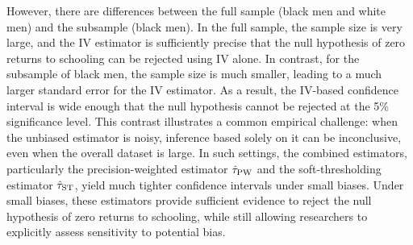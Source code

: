 \documentclass[11pt]{article}
\numberwithin{equation}{section}
\theoremstyle{definition}
\begin{document}
However, there are differences between the full sample (black men and white men) and the subsample (black men). In the full sample, the sample size is very large, and the IV estimator is sufficiently precise that the null hypothesis of zero returns to schooling can be rejected using IV alone. In contrast, for the subsample of black men, the sample size is much smaller, leading to a much larger standard error for the IV estimator. As a result, the IV-based confidence interval is wide enough that the null hypothesis cannot be rejected at the 5\% significance level. This contrast illustrates a common empirical challenge: when the unbiased estimator is noisy, inference based solely on it can be inconclusive, even when the overall dataset is large. In such settings, the combined estimators, particularly the precision-weighted estimator $\hat\tau_{\rm PW}$ and the soft-thresholding estimator $\hat\tau_{\rm ST}$, yield much tighter confidence intervals under small biases. Under small biases, these estimators provide sufficient evidence to reject the null hypothesis of zero returns to schooling, while still allowing researchers to explicitly assess sensitivity to potential bias.
\end{document}
